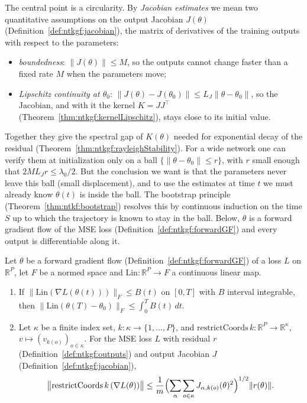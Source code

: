 The central point is a circularity. By \emph{Jacobian estimates} we mean two quantitative assumptions on the output Jacobian $J(\theta)$ (Definition~\ref{def:ntkgf:jacobian}), the matrix of derivatives of the training outputs with respect to the parameters:
\begin{itemize}
  \item \emph{boundedness}: $\|J(\theta)\|\le M$, so the outputs cannot change faster than a fixed rate $M$ when the parameters move;
  \item \emph{Lipschitz continuity at $\theta_0$}: $\|J(\theta)-J(\theta_0)\|\le L_J\|\theta-\theta_0\|$, so the Jacobian, and with it the kernel $K=JJ^\top$ (Theorem~\ref{thm:ntkgf:kernelLipschitz}), stays close to its initial value.
\end{itemize}
Together they give the spectral gap of $K(\theta)$ needed for exponential decay of the residual (Theorem~\ref{thm:ntkgf:rayleighStability}). For a wide network one can verify them at initialization only on a ball $\{\|\theta-\theta_0\|\le r\}$, with $r$ small enough that $2ML_Jr\le\lambda_0/2$. But the conclusion we want is that the parameters never leave this ball (small displacement), and to use the estimates at time $t$ we must already know $\theta(t)$ is inside the ball.
The bootstrap principle (Theorem~\ref{thm:ntkf:bootstrap}) resolves this by continuous induction on the time $S$ up to which the trajectory is known to stay in the ball. Below, $\theta$ is a forward gradient flow of the MSE loss
(Definition~\ref{def:ntkgf:forwardGF}) and every output is differentiable along it.

\begin{theorem}\label{thm:ntkgf:displacementLinear}
  \leanok
Let $\theta$ be a forward gradient flow (Definition~\ref{def:ntkgf:forwardGF}) of a loss $L$ on $\mathbb R^P$, let $F$ be a normed space and $\mathrm{Lin}:\mathbb R^P\to F$ a continuous linear map.
\begin{enumerate}
  \item If $\|\mathrm{Lin}(\nabla L(\theta(t)))\|_F\le B(t)$ on $[0,T]$ with $B$ interval integrable, then
        $\|\mathrm{Lin}(\theta(T)-\theta_0)\|_F\le\int_0^TB(t)\,dt$.
  \item Let $\kappa$ be a finite index set, $k:\kappa\to\{1,\dots,P\}$, and $\mathrm{restrictCoords}\,k:\mathbb R^P\to\mathbb R^\kappa$, $v\mapsto(v_{k(o)})_{o\in\kappa}$. For the MSE loss $L$ with residual $r$ (Definition~\ref{def:ntkgf:outputs}) and output Jacobian $J$ (Definition~\ref{def:ntkgf:jacobian}),
        \[
          \bigl\|\mathrm{restrictCoords}\,k\,(\nabla L(\theta))\bigr\|\le\frac1m\Bigl(\sum_{\alpha}\sum_{o\in\kappa}J_{\alpha,k(o)}(\theta)^2\Bigr)^{1/2}\|r(\theta)\| .
        \]
\end{enumerate}
\end{theorem}

